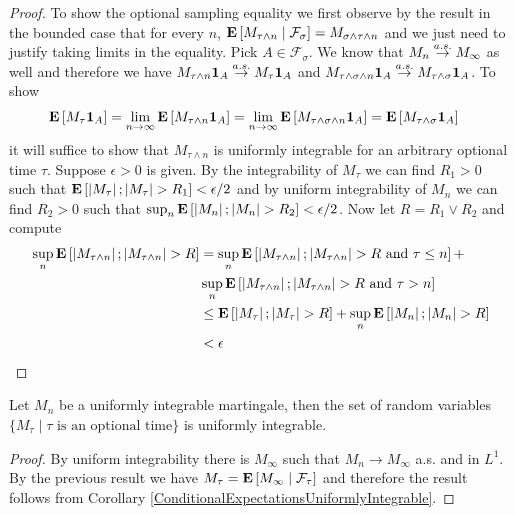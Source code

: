 \begin{proof}
To show the optional sampling equality we first observe by the result
in the bounded case that for every $n$, $\cexpectationlong{\mathcal{F}_\sigma}{M_{\tau
    \wedge n}} = M_{\sigma
    \wedge \tau \wedge n}$ and we just need to justify taking limits
  in the equality.  Pick $A \in
  \mathcal{F}_\sigma$.  We know that $M_n \toas M_\infty$ as well and therefore 
we have $M_{\tau
  \wedge n} \characteristic{A} \toas M_\tau \characteristic{A}$ and $M_{\tau
  \wedge \sigma \wedge n} \characteristic{A} \toas M_{\tau \wedge \sigma} \characteristic{A}$.  To
show 
\begin{align*}
\expectation{M_\tau \characteristic{A}} 
&= \lim_{n\to \infty} \expectation{M_{\tau
  \wedge n} \characteristic{A}} = \lim_{n\to \infty} \expectation{M_{\tau
  \wedge \sigma \wedge n} \characteristic{A}} 
= \expectation{M_{\tau \wedge \sigma} \characteristic{A}}
\end{align*} 
it will suffice to show that $M_{\tau \wedge n}$
is uniformly integrable for an arbitrary optional time $\tau$.  Suppose $\epsilon > 0$ is given.  By the
integrability of $M_\tau$ we can find $R_1 > 0$ such that
$\expectation{\abs{M_\tau}; \abs{M_\tau} > R_1} < \epsilon/2$ and by
uniform integrability of $M_n$ we can find $R_2 > 0$ such that $\sup_n
\expectation{\abs{M_n} ; \abs{M_n} > R_2} < \epsilon/2$.  Now let $R =
R_1 \vee R_2$ and compute
\begin{align*}
\sup_n \expectation{\abs{M_{\tau \wedge n}} ; \abs{M_{\tau \wedge n}}
  > R} &= \sup_n \expectation{\abs{M_{\tau \wedge n}} ; \abs{M_{\tau \wedge n}}
  > R \text{ and } \tau \leq n} + \\
&\sup_n \expectation{\abs{M_{\tau \wedge n}} ; \abs{M_{\tau \wedge n}}
  > R \text{ and } \tau > n} \\
&\leq \expectation{\abs{M_{\tau}} ; \abs{M_{\tau}}
  > R } + \sup_n \expectation{\abs{M_{n}} ; \abs{M_{n}}
  > R } \\
&< \epsilon
\end{align*}
\end{proof}

\begin{cor}Let $M_n$ be a uniformly integrable martingale, then the
  set of random variables $\lbrace M_\tau \mid \tau \text{ is an optional time}\rbrace$ is
  uniformly integrable.
\end{cor}
\begin{proof}
By uniform integrability there is $M_\infty$ such that $M_n \to
M_\infty$ a.s. and in $L^1$.  By the previous result we have $M_\tau =
\cexpectationlong{\mathcal{F}_\tau}{M_\infty}$ and therefore the
result follows from Corollary \ref{ConditionalExpectationsUniformlyIntegrable}.
\end{proof}

